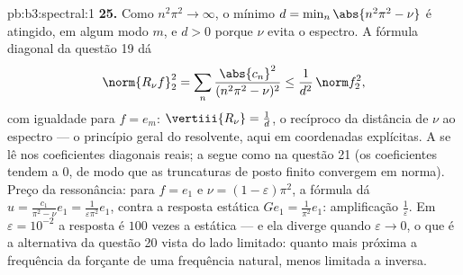 \begin{solution}{pb:b3:spectral:1}
\textbf{25.} Como $n^2\pi^2 \to \infty$, o mínimo $d =
\min_n\abs{n^2\pi^2 - \nu}$ é atingido, em algum modo $m$,
e $d > 0$ porque $\nu$ evita o espectro. A fórmula
diagonal da questão 19 dá
\[
\norm{R_\nu f}_2^2 =
\sum_n\frac{\abs{c_n}^2}{(n^2\pi^2 - \nu)^2}
\leq \frac1{d^2}\,\norm f_2^2,
\]
com igualdade para $f = e_m$: $\vertiii{R_\nu} = \frac1d$,
o recíproco da distância de $\nu$ ao espectro
--- o princípio geral do resolvente, aqui em coordenadas
explícitas. A  se lê nos coeficientes diagonais
reais; a  segue como na questão 21 (os
coeficientes tendem a $0$, de modo que as truncaturas de posto finito
convergem em norma). Preço da ressonância: para $f = e_1$ e $\nu =
(1-\varepsilon)\pi^2$, a fórmula dá $u =
\frac{c_1}{\pi^2 - \nu}e_1 = \frac1{\varepsilon\pi^2}e_1$,
contra a resposta estática $Ge_1 = \frac1{\pi^2}e_1$:
amplificação $\frac1\varepsilon$. Em $\varepsilon =
10^{-2}$ a resposta é $100$ vezes a estática --- e
ela diverge quando $\varepsilon \to 0$, o que é a alternativa da questão 20
vista do lado limitado: quanto mais próxima a frequência da
forçante de uma frequência natural, menos limitada a
inversa.
\end{solution}
